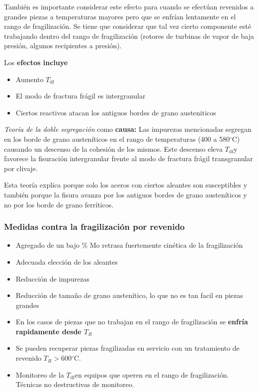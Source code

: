 \documentclass{article}
\newcommand{\Tdf}{\ensuremath{T_{\mathrm{df}}}}
\newcommand{\grad}{\ensuremath{^\circ \mathrm{C}}}
\begin{document}
También es importante considerar este efecto para cuando se efectúan revenidos a grandes piezas a temperaturas mayores pero que se enfrían lentamente en el rango de fragilización. Se tiene que considerar que tal vez cierto componente esté trabajando dentro del rango de fragilización (rotores de turbinas de vapor de baja presión, algunos recipientes a presión).

Los \textbf{efectos incluye}
\begin{itemize}
    \item Aumento \Tdf
    \item El modo de fractura frágil es intergranular
    \item Ciertos reactivos atacan los antiguos bordes de grano austeniticos
\end{itemize}

\textit{Teoría de la doble segregación} como \textbf{causa:} Las impurezas mencionadas segregan en los borde de grano austeníticos en el rango de temperaturas (400 a 580\grad) causando un descenso de la cohesión de los mismos. Este descenso eleva \Tdf y favorece la fisuración intergranular frente al modo de fractura frágil transgranular por clivaje. 

Esta teoría explica porque solo los aceros con ciertos aleantes son susceptibles y también porque la fisura avanza por los antiguos bordes de grano austeníticos y no por los borde de grano ferríticos.


\subsubsection{Medidas contra la fragilización por revenido}

\begin{itemize}
    \item Agregado de un bajo \% Mo retrasa fuertemente cinética de la fragilización
    \item Adecuada elección de los aleantes
    \item Reducción de impurezas
    \item Reducción de tamaño de grano austenítico, lo que no es tan facil en piezas grandes
    \item En los casos de piezas que no trabajan en el rango de fragilización se \textbf{enfría rapidamente desde $T_R$}
    \item Se pueden recuperar piezas fragilizadas en servicio con un tratamiento de revenido $T_R>600$\grad.
    \item Monitoreo de la \Tdf en equipos que operen en el rango de fragilización. Técnicas no destructivas de monitoreo.
\end{itemize}
\end{document}
